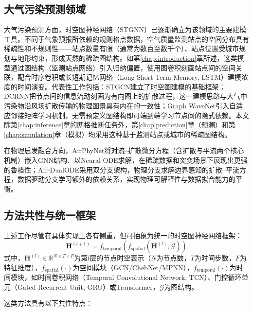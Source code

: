 \subsection{大气污染预测领域}

大气污染预测方面，时空图神经网络（STGNN）已逐渐确立为该领域的主要建模工具\citep{zhou2020graph,wu2020comprehensive}。不同于气象预报所依赖的规则格点数据，空气质量监测站点的空间分布具有稀疏性和不规则性——站点数量有限（通常为数百至数千个）、站点位置受城市规划与地形约束，形成天然的稀疏图结构。如第\ref{chap:introduction}章所述，这类模型通过图结构（监测站点网络）引入归纳偏置，使用图卷积刻画站点间的空间关联，配合时序卷积或长短期记忆网络（Long Short-Term Memory, LSTM）建模浓度的时间演变。代表性工作包括：STGCN\citep{yu2018spatio}建立了时空图建模的基础框架；DCRNN\citep{li2018diffusion}把节点间的信息流动刻画为有向图上的扩散过程，这一建模思路与大气中污染物沿风场扩散传输的物理图景具有内在的一致性；Graph WaveNet\citep{wu2019graph}引入自适应邻接矩阵学习机制，无需预定义图结构即可端到端学习节点间的隐式依赖。本文除第\ref{chap:inference}章的网格推断任务外，第\ref{chap:prediction}章（预测）和第\ref{chap:simulation}章（模拟）均采用这种基于监测站点或城市的稀疏图结构。

在物理启发融合方向，AirPhyNet\citep{hettigeairphynet}将对流--扩散微分方程（含扩散与平流两个核心机制）嵌入GNN结构、以Neural ODE求解，在稀疏数据和突变场景下展现出更强的鲁棒性；Air-DualODE\citep{tianair}采用双分支架构，物理分支求解边界感知的扩散--平流方程，数据驱动分支学习额外的依赖关系，实现物理可解释性与数据拟合能力的平衡。

\subsection{方法共性与统一框架}

上述工作尽管在具体实现上各有侧重，但可抽象为统一的时空图神经网络框架：
\begin{equation}
\mathbf{H}^{(l+1)} = f_{\text{temporal}}\left(f_{\text{spatial}}\left(\mathbf{H}^{(l)}, \mathcal{G}\right)\right)
\label{eq:stgnn_general}
\end{equation}
\noindent 式中，$\mathbf{H}^{(l)} \in \mathbb{R}^{N \times T \times F}$为第$l$层的节点时空表示（$N$为节点数，$T$为时间步数，$F$为特征维度），$f_{\text{spatial}}(\cdot)$为空间模块（GCN/ChebNet/MPNN），$f_{\text{temporal}}(\cdot)$为时间模块，如时间卷积网络（Temporal Convolutional Network, TCN）、门控循环单元（Gated Recurrent Unit, GRU）或Transformer，$\mathcal{G}$为图结构。

这类方法具有以下共性特点：


